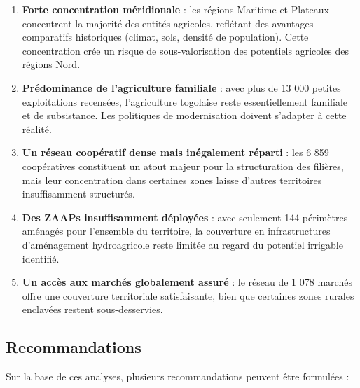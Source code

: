 \documentclass[12pt, a4paper]{article}
\begin{document}
\begin{enumerate}[leftmargin=1.5em]
    \item \textbf{Forte concentration méridionale} : les régions Maritime et Plateaux concentrent
          la majorité des entités agricoles, reflétant des avantages comparatifs historiques (climat,
          sols, densité de population). Cette concentration crée un risque de sous-valorisation des
          potentiels agricoles des régions Nord.

    \item \textbf{Prédominance de l'agriculture familiale} : avec plus de 13 000 petites exploitations
          recensées, l'agriculture togolaise reste essentiellement familiale et de subsistance. Les
          politiques de modernisation doivent s'adapter à cette réalité.

    \item \textbf{Un réseau coopératif dense mais inégalement réparti} : les 6 859 coopératives
          constituent un atout majeur pour la structuration des filières, mais leur concentration dans
          certaines zones laisse d'autres territoires insuffisamment structurés.

    \item \textbf{Des ZAAPs insuffisamment déployées} : avec seulement 144 périmètres aménagés
          pour l'ensemble du territoire, la couverture en infrastructures d'aménagement hydroagricole
          reste limitée au regard du potentiel irrigable identifié.

    \item \textbf{Un accès aux marchés globalement assuré} : le réseau de 1 078 marchés offre
          une couverture territoriale satisfaisante, bien que certaines zones rurales enclavées
          restent sous-desservies.
\end{enumerate}

\subsection{Recommandations}

Sur la base de ces analyses, plusieurs recommandations peuvent être formulées :
\end{document}
